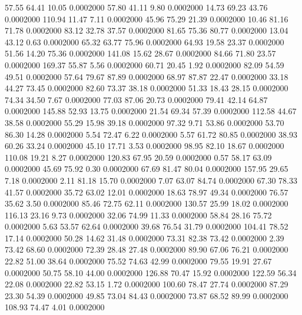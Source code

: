   57.55   64.41   10.05   0.0002000
  57.80   41.11    9.80   0.0002000
  14.73   69.23   43.76   0.0002000
 110.94   11.47    7.11   0.0002000
  45.96   75.29   21.39   0.0002000
  10.46   81.16   71.78   0.0002000
  83.12   32.78   37.57   0.0002000
  81.65   75.36   80.77   0.0002000
  13.04   43.12    0.63   0.0002000
  65.32   63.77   75.96   0.0002000
  64.93   19.58   23.37   0.0002000
  51.56   14.20   75.36   0.0002000
 141.08   15.62   28.67   0.0002000
  84.66   71.80   23.57   0.0002000
 169.37   55.87    5.56   0.0002000
  60.71   20.45    1.92   0.0002000
  82.09   54.59   49.51   0.0002000
  57.64   79.67   87.89   0.0002000
  68.97   87.87   22.47   0.0002000
  33.18   44.27   73.45   0.0002000
  82.60   73.37   38.18   0.0002000
  51.33   18.43   28.15   0.0002000
  74.34   34.50    7.67   0.0002000
  77.03   87.06   20.73   0.0002000
  79.41   42.14   64.87   0.0002000
 145.88   52.93   13.75   0.0002000
  21.54   69.34   57.39   0.0002000
 112.58   44.67   38.58   0.0002000
  55.29   15.98   39.18   0.0002000
  97.32    9.71   53.86   0.0002000
  53.70   86.30   14.28   0.0002000
   5.54   72.47    6.22   0.0002000
   5.57   61.72   80.85   0.0002000
  38.93   60.26   33.24   0.0002000
  45.10   17.71    3.53   0.0002000
  98.95   82.10   18.67   0.0002000
 110.08   19.21    8.27   0.0002000
 120.83   67.95   20.59   0.0002000
   0.57   58.17   63.09   0.0002000
  45.69   75.92    0.30   0.0002000
  67.69   81.47   80.04   0.0002000
 157.95   29.65    7.18   0.0002000
   2.11   81.18   15.70   0.0002000
   7.07   63.07   84.74   0.0002000
  67.30   78.33   41.57   0.0002000
  35.72   63.02   12.01   0.0002000
  18.63   78.97   49.34   0.0002000
  76.57   35.62    3.50   0.0002000
  85.46   72.75   62.11   0.0002000
 130.57   25.99   18.02   0.0002000
 116.13   23.16    9.73   0.0002000
  32.06   74.99   11.33   0.0002000
  58.84   28.16   75.72   0.0002000
   5.63   53.57   62.64   0.0002000
  39.68   76.54   31.79   0.0002000
 104.41   78.52   17.14   0.0002000
  50.28   14.62   31.48   0.0002000
  73.31   82.38   73.42   0.0002000
   2.39   73.42   68.60   0.0002000
  72.39   28.48   27.48   0.0002000
  89.90   67.06   76.21   0.0002000
  22.82   51.00   38.64   0.0002000
  75.52   74.63   42.99   0.0002000
  79.55   19.91   27.67   0.0002000
  50.75   58.10   44.00   0.0002000
 126.88   70.47   15.92   0.0002000
 122.59   56.34   22.08   0.0002000
  22.82   53.15    1.72   0.0002000
 100.60   78.47   27.74   0.0002000
  87.29   23.30   54.39   0.0002000
  49.85   73.04   84.43   0.0002000
  73.87   68.52   89.99   0.0002000
 108.93   74.47    4.01   0.0002000
